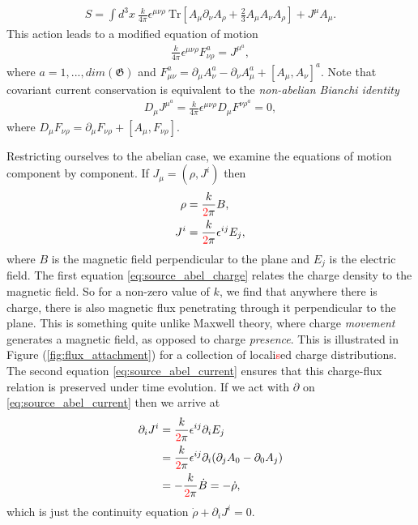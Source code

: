    \begin{align}
        S = \int d^3x \ \frac{k}{4 \pi} \epsilon^{\mu \nu \rho} \ \mathrm{Tr} \left[A_{\mu} \partial_{\nu} A_{\rho}+ \frac{2}{3} A_{\mu} A_{\nu} A_{\rho} \right] + J^{\mu} A_{\mu}.
    \end{align}
    This action leads to a modified equation of motion
    \begin{align}
        \frac{k}{4 \pi} \epsilon^{\mu \nu \rho} F^a_{\nu \rho} = J^{\mu}^a,
    \end{align}
    where $a=1,...,dim(\mathfrak{G})$ and $F_{\mu \nu}^a = \partial_{\mu} A_{\nu}^a - \partial_{\nu} A_{\mu}^a + [A_{\mu}, A_{\nu}]^a$. Note that covariant current conservation is equivalent to the \textit{non-abelian Bianchi identity}
    \begin{align}
        D_{\mu} J^{\mu}^a = \frac{k}{4 \pi} \epsilon^{\mu \nu \rho} D_{\mu} F^{\nu \rho}^a = 0,
    \end{align}
    where $D_{\mu} F_{\nu \rho} = \partial_{\mu} F_{\nu \rho} + [A_{\mu}, F_{\nu \rho}]$.

    Restricting ourselves to the abelian case, we examine the equations of motion component by component. If $J_{\mu} = (\rho, J^i)$ then
    \begin{align}
        \rho  &= \frac{k}{\textcolor{red}{2} \pi} B \label{eq:source_abel_charge} ,\\
        J^i &= \frac{k}{\textcolor{red}{2} \pi} \epsilon^{i j } E_j \label{eq:source_abel_current},
    \end{align}
    where $B$ is the magnetic field perpendicular to the plane and $E_j$ is the electric field. The first equation \eqref{eq:source_abel_charge} relates the charge density to the magnetic field. So for a non-zero value of $k$, we find that anywhere there is charge, there is also magnetic flux penetrating through it perpendicular to the plane. This is something quite unlike Maxwell theory, where charge \textit{movement} generates a magnetic field, as opposed to charge \textit{presence}. This is illustrated in  Figure (\ref{fig:flux_attachment}) for a collection of locali\textcolor{red}{s}ed charge distributions. The second equation \eqref{eq:source_abel_current} ensures that this charge-flux relation is preserved under time evolution. If we act with $\partial$ on \eqref{eq:source_abel_current} then we arrive at
    \begin{align}
        \partial_i J^i &= \frac{k}{\textcolor{red}{2} \pi} \epsilon^{ij} \partial_i E_j\nonumber \\
        &= \frac{k}{\textcolor{red}{2} \pi} \epsilon^{ij} \partial_i ( \partial_j A_0 - \partial_0 A_j) \nonumber \\
        &= -\frac{k}{\textcolor{red}{2} \pi} \dot{B} = -\dot{\rho},
    \end{align}
    which is just the continuity equation $\dot{\rho} + \partial_i J^i=0$.





